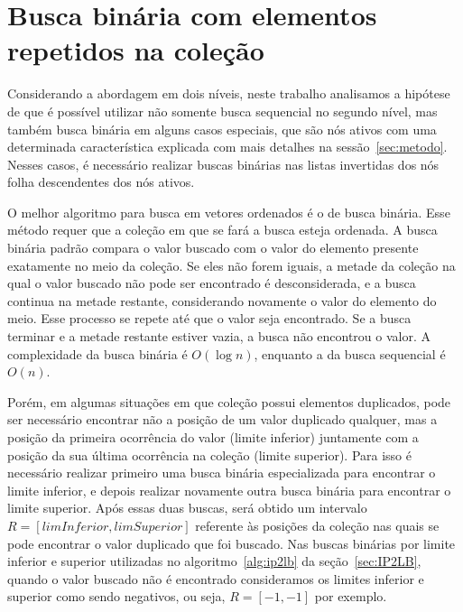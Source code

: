 \section{Busca binária com elementos repetidos na coleção}
\label{sec:binary_search_with_duplicates}

Considerando a abordagem em dois níveis, neste trabalho analisamos a hipótese de que é possível utilizar não somente busca sequencial no segundo nível, mas também busca binária em alguns casos especiais, que são nós ativos com uma determinada característica explicada com mais detalhes na sessão~\ref{sec:metodo}. Nesses casos, é necessário realizar buscas binárias nas listas invertidas dos nós folha descendentes dos nós ativos.

O melhor algoritmo para busca em vetores ordenados é o de busca binária. Esse método requer que a coleção em que se fará a busca esteja ordenada. A busca binária padrão compara o valor buscado com o valor do elemento presente exatamente no meio da coleção. Se eles não forem iguais, a metade da coleção na qual o valor buscado não pode ser encontrado é desconsiderada, e a busca continua na metade restante, considerando novamente o valor do elemento do meio. Esse processo se repete até que o valor seja encontrado. Se a busca terminar e a metade restante estiver vazia, a busca não encontrou o valor. A complexidade da busca binária é $O(\log n)$, enquanto a da busca sequencial é $O(n)$.

Porém, em algumas situações em que coleção possui elementos duplicados, pode ser necessário encontrar não a posição de um valor duplicado qualquer, mas a posição da primeira ocorrência do valor (limite inferior) juntamente com a posição da sua última ocorrência na coleção (limite superior). Para isso é necessário realizar primeiro uma busca binária especializada para encontrar o limite inferior, e depois realizar novamente outra busca binária para encontrar o limite superior. Após essas duas buscas, será obtido um intervalo $R = [limInferior, limSuperior]$ referente às posições da coleção nas quais se pode encontrar o valor duplicado que foi buscado. Nas buscas binárias por limite inferior e superior utilizadas no algoritmo~\ref{alg:ip2lb} da seção~\ref{sec:IP2LB}, quando o valor buscado não é encontrado consideramos os limites inferior e superior como sendo negativos, ou seja, $R = [-1, -1]$ por exemplo.